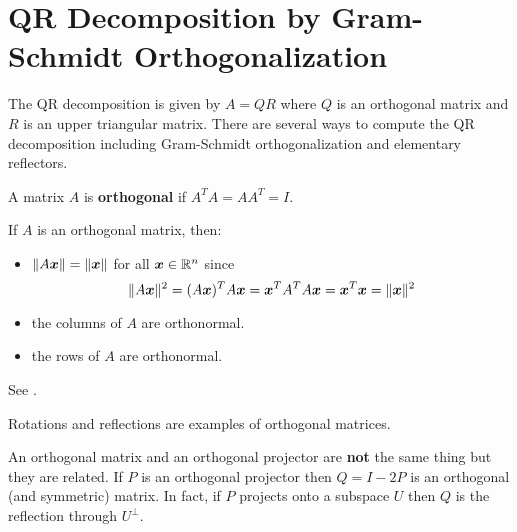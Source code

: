 \section{QR Decomposition by Gram-Schmidt Orthogonalization}

\begin{bigidea}
The QR decomposition is given by $A = QR$ where $Q$ is an orthogonal matrix and $R$ is an upper triangular matrix. There are several ways to compute the QR decomposition including Gram-Schmidt orthogonalization and elementary reflectors.
\end{bigidea}

\begin{definition}
A matrix $A$ is {\bf orthogonal} \cite[p.424]{KN} if $A^TA = AA^T = I$.
\end{definition}

\begin{proposition}
 If $A$ is an orthogonal matrix, then:
\begin{itemize}
\item $\| A \boldsymbol{x} \| = \| \boldsymbol{x} \|$ for all $\boldsymbol{x} \in \mathbb{R}^n$ since
$$
\| A \boldsymbol{x} \|^2 = (A \boldsymbol{x})^T A \boldsymbol{x} = \boldsymbol{x}^T A^T A \boldsymbol{x} = \boldsymbol{x}^T \boldsymbol{x} = \| \boldsymbol{x} \|^2
$$
\item the columns of $A$ are orthonormal.
\item the rows of $A$ are orthonormal.
\end{itemize}
See \cite[p.424]{KN}.
\end{proposition}

\begin{example}
Rotations and reflections are examples of orthogonal matrices.
\end{example}

\begin{note}
An orthogonal matrix and an orthogonal projector are {\bf not} the same thing but they are related. If $P$ is an orthogonal projector then $Q = I - 2P$ is an orthogonal (and symmetric) matrix. In fact, if $P$ projects onto a subspace $U$ then $Q$ is the reflection through $U^{\perp}$.
\end{note}

